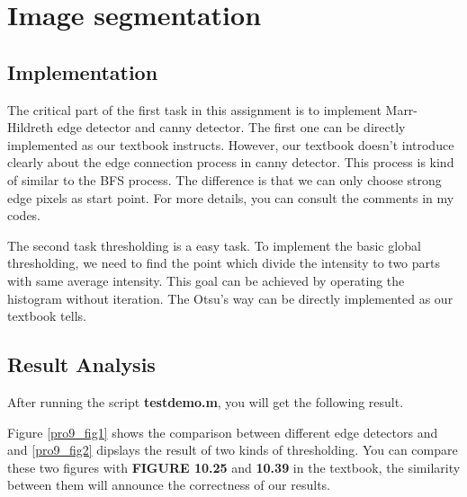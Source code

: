 \documentclass[11pt,a4paper]{article}
\begin{document}
\section{Image segmentation}
\subsection{Implementation}
The critical part of the first task in this assignment is to implement Marr-Hildreth edge
detector and canny detector. The first one can be directly implemented as our textbook
instructs. However, our textbook doesn't introduce clearly about the edge connection process
in canny detector. This process is kind of similar to the BFS process. The difference is that 
we can only choose strong edge pixels as start point. For more details, you can consult the comments
in my codes.

The second task thresholding is a easy task. To implement the basic global thresholding, we need to
find the point which divide the intensity to two parts with same average intensity. This goal can be
achieved by operating the histogram without iteration. The Otsu's way can be directly implemented as
our textbook tells.

\subsection{Result Analysis}
After running the script \textbf{testdemo.m}, you will get the following result.

Figure \ref{pro9_fig1} shows the comparison between different edge detectors and 
and \ref{pro9_fig2} dipslays the result of two kinds of thresholding.
You can compare these two figures with \textbf{FIGURE 10.25} and \textbf{10.39} in the
textbook, the similarity between
them will announce the correctness of our results.
\end{document}
